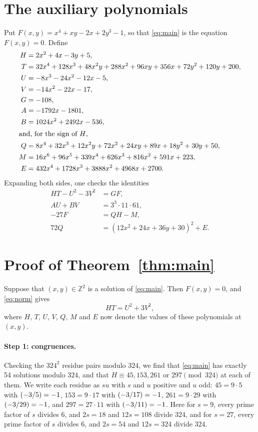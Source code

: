 \documentclass[11pt]{article}
\newcommand{\Z}{\mathbb{Z}}
\newcommand{\leg}[2]{\mathchoice{\biggl(\dfrac{#1}{#2}\biggr)}{(#1/#2)}{(#1/#2)}{(#1/#2)}}
\begin{document}
\section{The auxiliary polynomials}

Put $F(x,y)=x^{4}+xy-2x+2y^{3}-1$, so that \eqref{eq:main} is the equation $F(x,y)=0$. Define
\begin{align*}
H&=2x^{2}+4x-3y+5,\\
T&=32x^{4}+128x^{3}+48x^{2}y+288x^{2}+96xy+356x+72y^{2}+120y+200,\\
U&=-8x^{3}-24x^{2}-12x-5,\\
V&=-14x^{2}-22x-17,\\
G&=-108,\\
A&=-1792x-1801,\\
B&=1024x^{2}+2492x-536,\\
\intertext{and, for the sign of $H$,}
Q&=8x^{4}+32x^{3}+12x^{2}y+72x^{2}+24xy+89x+18y^{2}+30y+50,\\
M&=16x^{6}+96x^{5}+339x^{4}+626x^{3}+816x^{2}+591x+223,\\
E&=432x^{4}+1728x^{3}+3888x^{2}+4968x+2700.
\end{align*}
Expanding both sides, one checks the identities
\begin{align}
HT-U^2-3V^2&=GF,\label{eq:norm}\\
AU+BV&=3^{3}\cdot 11\cdot 61,\label{eq:bezout}\\
-27F&=QH-M,\label{eq:sign}\\
72Q&=(12x^{2}+24x+36y+30)^2+E.\label{eq:sign2}
\end{align}

\section{Proof of Theorem~\ref{thm:main}}

Suppose that $(x,y)\in\Z^2$ is a solution of \eqref{eq:main}. Then $F(x,y)=0$, and \eqref{eq:norm} gives
\begin{equation}\label{eq:HT}
HT=U^2+3V^2,
\end{equation}
where $H$, $T$, $U$, $V$, $Q$, $M$ and $E$ now denote the values of these polynomials at $(x,y)$.

\paragraph{Step 1: congruences.} Checking the $324^2$ residue pairs modulo $324$, we find that \eqref{eq:main} has exactly 54 solutions modulo $324$, and that $H\equiv45,\allowbreak 153,\allowbreak 261\text{ or }297\pmod{324}$ at each of them. We write each residue as $su$ with $s$ and $u$ positive and $u$ odd: $45=9\cdot5$ with $\leg{-3}{5}=-1$, $153=9\cdot17$ with $\leg{-3}{17}=-1$, $261=9\cdot29$ with $\leg{-3}{29}=-1$, and $297=27\cdot11$ with $\leg{-3}{11}=-1$. Here for $s=9$, every prime factor of $s$ divides $6$, and $2s=18$ and $12s=108$ divide $324$, and for $s=27$, every prime factor of $s$ divides $6$, and $2s=54$ and $12s=324$ divide $324$.
\end{document}
